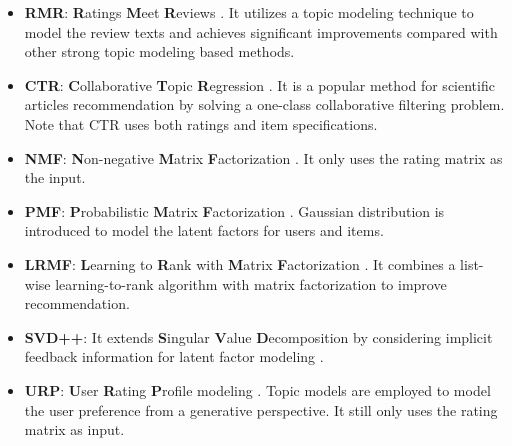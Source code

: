 \documentclass[sigconf]{acmart}
\begin{document}
\begin{itemize}
	
	\item \textbf{RMR}: \textbf{R}atings \textbf{M}eet \textbf{R}eviews \cite{ling2014ratings}. %
	It utilizes a topic modeling technique to model the review texts and achieves significant improvements compared with other strong topic modeling based methods.
	
	\item \textbf{CTR}: \textbf{C}ollaborative \textbf{T}opic \textbf{R}egression \cite{wang2011collaborative}. It is a popular method for scientific articles recommendation by solving a one-class collaborative filtering problem. Note that CTR uses both ratings and item specifications.	
	
	
	\item \textbf{NMF}: \textbf{N}on-negative \textbf{M}atrix \textbf{F}actorization \cite{lee2001algorithms}.
	It only uses the rating matrix as the input.
	
	\item \textbf{PMF}: \textbf{P}robabilistic \textbf{M}atrix \textbf{F}actorization \cite{mnih2007probabilistic}.
	Gaussian distribution is introduced to model the latent factors for users and items.
	
	\item \textbf{LRMF}: \textbf{L}earning to \textbf{R}ank with \textbf{M}atrix \textbf{F}actorization \cite{shi2010list}. It combines a list-wise learning-to-rank algorithm with matrix factorization to improve recommendation.
	
	\item \textbf{SVD++}: It extends \textbf{S}ingular \textbf{V}alue \textbf{D}ecomposition by considering implicit feedback information for latent factor modeling \cite{koren2008factorization}.
	
	\item \textbf{URP}: \textbf{U}ser \textbf{R}ating \textbf{P}rofile modeling \cite{marlin2003modeling}. Topic models are employed to model the user preference from a generative perspective. It still only uses the rating matrix as input.
	
\end{itemize}
\end{document}
